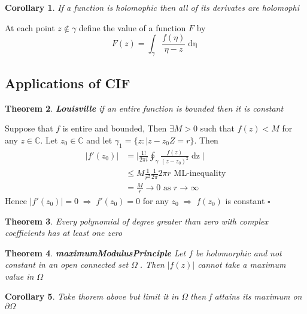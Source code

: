 \documentclass{article}
\newtheorem{theorem}{Theorem}[section]
\newtheorem{corollary}[theorem]{Corollary}
\newenvironment{proof}[1][Proof]{\begin{trivlist}
\item[\hskip \labelsep {\bfseries #1}]}{\end{trivlist}}
\newcommand{\C}{\mathbb{C}}
\newcommand{\OO}{$ \Omega \;$}
\begin{document}
\begin{corollary}
    If a function is holomophic then all of its derivates are holomophi
\end{corollary}
\begin{proof}
    At each point $z \notin \gamma$ define the value of a function $F$ by
    \[F(z) = \int_\gamma \frac{f(\eta)}{\eta - z} \mathop{d\eta}\]
\end{proof}

\subsection*{Applications of CIF}
\begin{theorem} \label{Louisville} \textbf{Louisville}
    if an entire function is bounded then it is constant
\end{theorem}
\begin{proof}
    Suppose that $f$ is entire and bounded, Then $\exists M > 0$ such that
    $f(z) < M$ for any $z \in \C$. Let $z_0 \in \C$ and let $\gamma_1 = \{z: |z-z_0Z=r\}$. Then
    \begin{align*}
        |f'(z_0)| &= \biggr\rvert \frac{1!}{2 \pi i} \oint_\gamma \frac{f(z)}{(z-z_0)^2} \mathop{dz} \biggr\rvert\\
                 &\leq M\frac{1}{r^2}\frac{1}{2\pi}2\pi r \text{ ML-inequality}\\
                 &= \frac{M}{r} \rightarrow 0 \text{ as } r \rightarrow \infty
    \end{align*}
    Hence $|f'(z_0)| = 0 \; \Rightarrow \; f'(z_0) = 0$ for any $z_0 \; \Rightarrow \; f(z_0)$ is constant 
    \hfill$\square$
\end{proof}

\begin{theorem}
    Every polynomial of degree greater than zero with complex coefficients has at least one zero
\end{theorem}

\begin{theorem} \label{maximumModulusPrinciple} \textbf{maximumModulusPrinciple}
    Let $f$ be holomorphic and not constant in an open connected set \OO. Then
    $|f(z)|$ cannot take a maximum value in \OO
\end{theorem}

\begin{corollary}
    Take thorem above but limit it in \OO then f attains its maximum on $\partial \Omega$
\end{corollary}
\end{document}
